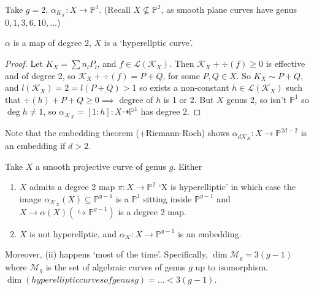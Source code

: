 \documentclass{article}
\newcommand{\proj}{\mathbb{P}}
\begin{document}
\begin{eg}
    Take $g = 2$, $\alpha_{K_X}: X \to \proj^1$.
    (Recall $X \nsubseteq \proj^2$, as smooth plane curves have genus $0, 1, 3, 6, 10, \dotsc$)
\end{eg}
\begin{lemma}
    $\alpha$ is a map of degree 2, $X$ is a `hyperellptic curve'.
\end{lemma}
\begin{proof}
    Let $K_X = \sum n_l P_l$, and $f \in \mathcal{L}(\mathcal{K}_X)$.
    Then $\mathcal{K}_X + \div(f) \geq 0$ is effective and of degree 2, so $\mathcal{K}_X + \div(f) = P+Q$, for some $P, Q \in X$.
    So $K_X \sim P+Q$, and $l(\mathcal{K}_X) = 2 = l(P+Q) > 1$ so exists a non-constant $h \in \mathcal{L}(\mathcal{K}_X)$ such that $\div(h) + P + Q \geq 0 \implies $ degree of $h$ is 1 or 2.
    But $X$ genus $2$, so isn't $\proj^1$ so $\deg h \neq 1$, so $\alpha_{\mathcal{K}_X}=[1:h]: X \dashrightarrow \proj^1$ has degree $2$.
\end{proof}
Note that the embedding theorem (+Riemann-Roch) shows $\alpha_{d \mathcal{K}_X}: X \to \proj^{2d-2}$ is an embedding if $d > 2$.
\begin{prop}
    Take $X$ a smooth projective curve of genus $g$.
    Either
    \begin{enumerate}[label=(\roman*)]
        \item $X$ admits a degree 2 map $\pi:X \to \proj^2$ `X is hyperelliptic'
            in which case the image $\alpha_{\mathcal{K}_X}(X) \subseteq \proj^{g-1}$ is a $\proj^1$ sitting inside $\proj^{g-1}$ and $X \to \alpha(X) (\hookrightarrow \proj^{g-1})$ is a degree 2 map.
        \item $X$ is not hyperellptic, and $\alpha_{\mathcal{K}}: X \to \proj^{g-1}$ is an embedding.
    \end{enumerate}
    Moreover, (ii) happens `most of the time'. Specifically, $\dim \mathscr{M}_g = 3(g-1)$ where $\mathscr{M}_g$ is the set of algebraic curves of genus $g$ up to isomorphism.
    $\dim(hyperelliptic curves of genus g) = ... < 3(g-1)$.
\end{prop}
\end{document}
